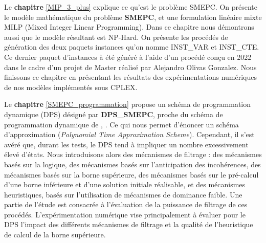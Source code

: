 Le \textbf{chapitre} \ref{MIP_3_plus} explique ce qu'est le problème SMEPC. On présente le modèle mathématique du problème \textbf{SMEPC}, et une formulation linéaire mixte MILP (Mixed Integer Linear Programming). Dans ce chapitre nous démontrons aussi que le modèle résultant est NP-Hard. %
 On présente les procédés de génération des deux paquets instances qu'on nomme INST\_VAR et INST\_CTE. Ce dernier paquet d'instances à été généré à l'aide d'un procédé conçu en 2022 dans le cadre d'un projet de Master réalisé par Alejandro Olivas Gonzalez. 
  Nous finissons ce chapitre en présentant les résultats des expérimentations numériques de nos modèles implémentés sous CPLEX.

Le \textbf{chapitre} \ref{SMEPC_programmation} propose un schéma de programmation dynamique (DPS) désigné par \textbf{DPS\_SMEPC}, proche du schéma de programmation dynamique de \cite{inproceedings-Baptiste-Scheduling}, \cite{article-Demaine-Scheduling}. Ce qui nous permet d'énoncer un schéma d'approximation (\textit{Polynomial Time Approximation Scheme}). Cependant, il s'est avéré que, durant les tests, le DPS tend à impliquer un nombre excessivement élevé d'états. Nous introduisons alors des mécanismes de filtrage :  des mécanismes basés sur la logique, des mécanismes basés sur l'anticipation des incohérences, des mécanismes basés sur la borne supérieure, des mécanismes basés sur le pré-calcul d'une borne inférieure et d'une solution initiale réalisable, et des mécanismes heuristiques, basés sur l'utilisation de mécanismes de dominance faible. Une partie de l'étude est consacrée à l'évaluation de la puissance de filtrage de ces procédés. L'expérimentation numérique vise principalement à évaluer pour le DPS l'impact des différents mécanismes de filtrage et la qualité de l'heuristique de calcul de la borne supérieure.

